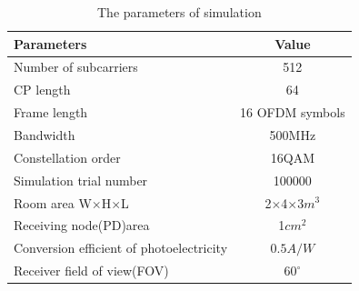 \documentclass[10pt,journal]{IEEEtran}
\begin{document}
    \begin{table} [htb]
        \caption{The parameters of simulation}
        \captionsetup{belowskip=-10pt}
         \centering\begin{tabular}{|l|c|}
                    \hline
                    Parameters & Value\\
                    \hline
                    Number of subcarriers & 512 \\
                    \hline
                    CP length & 64\\
                    \hline
                    Frame length & 16 OFDM symbols\\
                    \hline
                    Bandwidth & 500MHz \\
                    \hline
                    Constellation order & 16QAM \\
                    \hline
                    Simulation trial number & 100000 \\
                    \hline
                    Room area W$\times$H$\times$L & 2$\times$4$\times$3$m^3$\\
                    \hline
                    Receiving node(PD)area & 1$cm^2$ \\
                    \hline
                    Conversion efficient of photoelectricity & $0.5A/W$ \\
                    \hline
                    Receiver field of view(FOV) & $60^{\circ}$ \\
                    \hline
                    \end{tabular}
         \label{Tab:paramters}
    \end{table}
\end{document}

